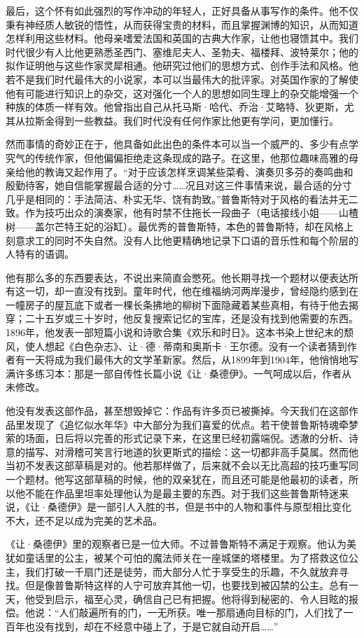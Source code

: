 \par 最后，这个怀有如此强烈的写作冲动的年轻人，正好具备从事写作的条件。他不仅秉有神经质人敏锐的悟性，从而获得宝贵的材料，而且掌握渊博的知识，从而知道怎样利用这些材料。他母亲嗜爱法国和英国的古典大作家，让他也寝馈其中。我们时代很少有人比他更熟悉圣西门、塞维尼夫人、圣勃夫、福楼拜、波特莱尔；他的拟作证明他与这些作家灵犀相通。他研究过他们的思想方式、创作手法和风格。他若不是我们时代最伟大的小说家，本可以当最伟大的批评家。对英国作家的了解使他有可能进行知识上的杂交，这对强化一个人的思想如同生理上的杂交能增强一个种族的体质一样有效。他曾指出自己从托马斯·哈代、乔治·艾略特、狄更斯，尤其从拉斯金得到一些教益。我们时代没有任何作家比他更有学问，更加懂行。
\par 然而事情的奇妙正在于，他具备如此出色的条件本可以当一个威严的、多少有点学究气的传统作家，但他偏偏拒绝走这条现成的路子。在这里，他那位趣味高雅的母亲给他的教诲又起作用了。“对于应该怎样烹调某些菜肴、演奏贝多芬的奏鸣曲和殷勤待客，她自信能掌握最合适的分寸……况且对这三件事情来说，最合适的分寸几乎是相同的：手法简洁、朴实无华、饶有韵致。”普鲁斯特对于风格的看法并无二致。作为技巧出众的演奏家，他有时禁不住拖长一段曲子（电话接线小姐——山楂树——盖尔芒特王妃的浴缸）。最优秀的普鲁斯特，本色的普鲁斯特，却在风格上刻意求工的同时不失自然。没有人比他更精确地记录下口语的音乐性和每个阶层的人特有的语调。
\par 他有那么多的东西要表达，不说出来简直会憋死。他长期寻找一个题材以便表达所有这一切，却一直没有找到。童年时代，他在维福纳河两岸漫步，曾经隐约感到在一幢房子的屋瓦底下或者一棵长条拂地的柳树下面隐藏着某些真相，有待于他去揭穿；二十五岁或三十岁时，他反复搜索记忆的宝库，还是没有找到他需要的东西。1896年，他发表一部短篇小说和诗歌合集《欢乐和时日》。这本书染上世纪末的颓风，使人想起《白色杂志》、让·德·蒂南和奥斯卡·王尔德。没有一个读者猜到作者有一天将成为我们最伟大的文学革新家。然后，从1899年到1904年，他悄悄地写满许多练习本：那是一部自传性长篇小说《让·桑德伊》。一气呵成以后，作者从未修改。
\par 他没有发表这部作品，甚至想毁掉它：作品有许多页已被撕掉。今天我们在这部作品里发现了《追忆似水年华》中大部分为我们喜爱的优点。若干使普鲁斯特魂牵梦萦的场面，日后将以完善的形式记录下来，在这里已经初露端倪。透澈的分析、诗意的描写、对滑稽可笑言行地道的狄更斯式的描绘：这一切都非高手莫属。然而他当初不发表这部草稿是对的。他若那样做了，后来就不会以无比高超的技巧重写同一个题材。他写这部草稿的时候，他的双亲犹在，而且还可能是他最初的读者，所以他不能在作品里坦率处理他认为是最主要的东西。对于我们这些普鲁斯特迷来说，《让·桑德伊》是一部引人入胜的书，但是书中的人物和事件与原型相比变化不大，还不足以成为完美的艺术品。
\par 《让·桑德伊》里的观察者已是一位大师。不过普鲁斯特不满足于观察。他认为美犹如童话里的公主，被某个可怕的魔法师关在一座城堡的塔楼里。为了搭救这位公主，我们打破一千扇门还是徒劳，而大部分人忙于享受生的乐趣，不久就放弃寻找。但是像普鲁斯特这样的人宁可放弃其他一切，也要找到被囚禁的公主。总有一天，他受到启示，福至心灵，确信自己已有把握。他将得到秘密的、令人目眩的报偿。他说：“人们敲遍所有的门，一无所获。唯一那扇通向目标的门，人们找了一百年也没有找到，却在不经意中碰上了，于是它就自动开启……”
